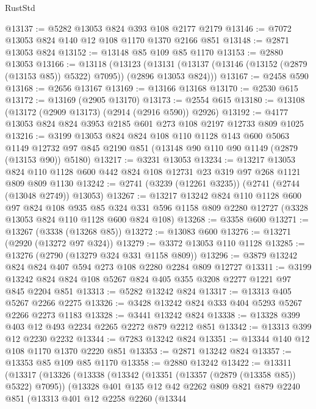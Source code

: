 \begin{lexlean}{RustStd}
\begin{coremodule}
@13137 := @5282 @13053 @824 @393 @108 @2177 @2179
@13146 := @7072 @13053 @824 @140 @12 @108 @1170 @1370 @2166 @851
@13148 := @2871 @13053 @824
@13152 := @13148 @85 @109 @85 @1170
@13153 := @2880 @13053
@13166 := @13118
    (@13123
      (@13131 (@13137 (@13146 (@13152 (@2879 (@13153 @85)) @5322) @7095)) (@2896 @13053 @824)))
@13167 := @2458 @590
@13168 := @2656 @13167
@13169 := @13166 @13168
@13170 := @2530 @615
@13172 := @13169 (@2905 @13170)
@13173 := @2554 @615
@13180 := @13108 (@13172 (@2909 @13173) (@2914 (@2916 @590)) @2926)
@13192 := @4177 @13053 @824 @824 @3953 @2185 @601 @273 @108 @2197 @12733 @809 @1025
@13216 := @3199
    @13053
    @824
    @824
    @108
    @110
    @1128
    @143
    @600
    @5063
    @1149
    @12732
    @97
    @845
    @2190
    @851
    (@13148 @90 @110 @90 @1149 (@2879 (@13153 @90)) @5180)
@13217 := @3231 @13053
@13234 := @13217
    @13053
    @824
    @110
    @1128
    @600
    @442
    @824
    @108
    @12731
    @23
    @319
    @97
    @268
    @1121
    @809
    @809
    @1130
@13242 := @2741 (@3239 (@12261 @3235)) (@2741 (@2744 (@13048 @2749)) @13053)
@13267 := @13217
    @13242
    @824
    @110
    @1128
    @600
    @97
    @824
    @108
    @935
    @85
    @324
    @331
    @596
    @1158
    @809
    @2280
    @12727
    (@3328 @13053 @824 @110 @1128 @600 @824 @108)
@13268 := @3358 @600
@13271 := @13267 (@3338 (@13268 @85))
@13272 := @13083 @600
@13276 := @13271 (@2920 (@13272 @97 @324))
@13279 := @3372 @13053 @110 @1128
@13285 := @13276 (@2790 (@13279 @324 @331 @1158 @809))
@13296 := @3879 @13242 @824 @824 @407 @594 @273 @108 @2280 @2284 @809 @12727
@13311 := @3199 @13242 @824 @824 @108 @5267 @824 @405 @355 @3208 @2277 @1221 @97 @845 @2204 @851
@13313 := @5282 @13242 @824
@13317 := @13313 @405 @5267 @2266 @2275
@13326 := @3428 @13242 @824 @333 @404 @5293 @5267 @2266 @2273 @1183
@13328 := @3441 @13242 @824
@13338 := @13328 @399 @403 @12 @493 @2234 @2265 @2272 @879 @2212 @851
@13342 := @13313 @399 @12 @2230 @2232
@13344 := @7283 @13242 @824
@13351 := @13344 @140 @12 @108 @1170 @1370 @2220 @851
@13353 := @2871 @13242 @824
@13357 := @13353 @85 @109 @85 @1170
@13358 := @2880 @13242
@13422 := @13311
    (@13317
      (@13326
        (@13338
          (@13342 (@13351 (@13357 (@2879 (@13358 @85)) @5322) @7095))
          (@13328
            @401
            @135
            @12
            @42
            @2262
            @809
            @821
            @879
            @2240
            @851
            (@13313
              @401
              @12
              @2258
              @2260
              (@13344

\end{coremodule}
\end{lexlean}
